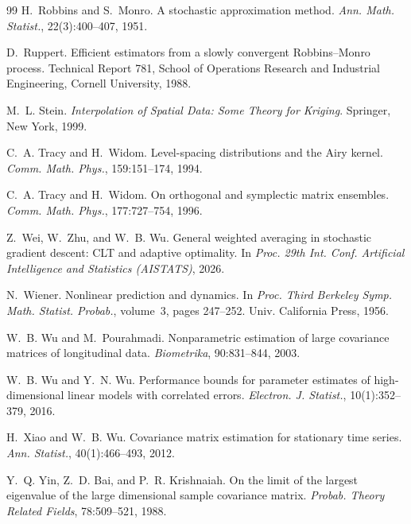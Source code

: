 \documentclass[12pt]{article}
\begin{document}
\begin{thebibliography}{99}
H.~Robbins and S.~Monro.
\newblock A stochastic approximation method.
\newblock \emph{Ann. Math. Statist.}, 22(3):400--407, 1951.

D.~Ruppert.
\newblock Efficient estimators from a slowly convergent {R}obbins--{M}onro process.
\newblock Technical Report 781, School of Operations Research and Industrial Engineering, Cornell University, 1988.

M.~L. Stein.
\newblock \emph{Interpolation of Spatial Data: Some Theory for Kriging}.
\newblock Springer, New York, 1999.

C.~A. Tracy and H.~Widom.
\newblock Level-spacing distributions and the {A}iry kernel.
\newblock \emph{Comm. Math. Phys.}, 159:151--174, 1994.

C.~A. Tracy and H.~Widom.
\newblock On orthogonal and symplectic matrix ensembles.
\newblock \emph{Comm. Math. Phys.}, 177:727--754, 1996.

Z.~Wei, W.~Zhu, and W.~B. Wu.
\newblock General weighted averaging in stochastic gradient descent: {CLT} and adaptive optimality.
\newblock In \emph{Proc. 29th Int. Conf. Artificial Intelligence and Statistics (AISTATS)}, 2026.

N.~Wiener.
\newblock Nonlinear prediction and dynamics.
\newblock In \emph{Proc. Third Berkeley Symp. Math. Statist. Probab.}, volume~3, pages 247--252. Univ. California Press, 1956.

W.~B. Wu and M.~Pourahmadi.
\newblock Nonparametric estimation of large covariance matrices of longitudinal data.
\newblock \emph{Biometrika}, 90:831--844, 2003.

W.~B. Wu and Y.~N. Wu.
\newblock Performance bounds for parameter estimates of high-dimensional linear models with correlated errors.
\newblock \emph{Electron. J. Statist.}, 10(1):352--379, 2016.

H.~Xiao and W.~B. Wu.
\newblock Covariance matrix estimation for stationary time series.
\newblock \emph{Ann. Statist.}, 40(1):466--493, 2012.

Y.~Q. Yin, Z.~D. Bai, and P.~R. Krishnaiah.
\newblock On the limit of the largest eigenvalue of the large dimensional sample covariance matrix.
\newblock \emph{Probab. Theory Related Fields}, 78:509--521, 1988.


\end{thebibliography}
\end{document}
